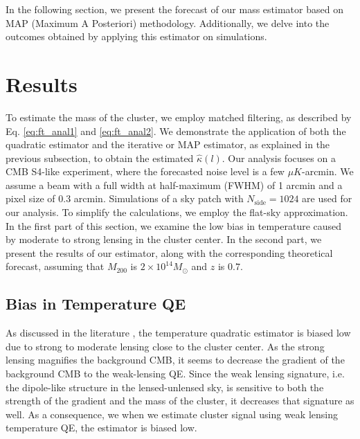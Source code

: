 \documentclass[prd, superscriptaddress, tightenlines, longbibliography, nofootinbib, eqsecnum, amsfonts, amsmath, floatfix, twocolumn, notitlepage]{revtex4-2}
\begin{document}
In the following section, we present the forecast of our mass estimator based on MAP (Maximum A Posteriori) methodology. Additionally, we delve into the outcomes obtained by applying this estimator on simulations.

\section{Results}
\label{sec:results}

To estimate the mass of the cluster, we employ matched filtering, as described by Eq. \ref{eq:ft_anal1} and \ref{eq:ft_anal2}. We demonstrate the application of both the quadratic estimator and the iterative or MAP estimator, as explained in the previous subsection, to obtain the estimated $\hat{\kappa}(l)$.
Our analysis focuses on a CMB S4-like experiment, where the forecasted noise level is a few $\mu K$-arcmin. We assume a beam with a full width at half-maximum (FWHM) of 1 arcmin and a pixel size of $0.3$ arcmin. Simulations of a sky patch with $N_{\text{side}}=1024$ are used for our analysis. To simplify the calculations, we employ the flat-sky approximation.
In the first part of this section, we examine the low bias in temperature caused by moderate to strong lensing in the cluster center. In the second part, we present the results of our estimator, along with the corresponding theoretical forecast, assuming that $M_{200}$ is $2\times10^{14} M_{\odot}$ and $z$ is $0.7$.
\subsection{Bias in Temperature QE}
As discussed in the literature \cite{Hu:2007bt, Maturi:2004zj, Amblard:2004ih}, the temperature quadratic estimator is biased low due to strong to moderate lensing close to the cluster center. As the strong lensing magnifies the background CMB, it seems to decrease the gradient of the background CMB to the weak-lensing QE. Since the weak lensing signature, i.e. the dipole-like structure in the lensed-unlensed sky, is sensitive to both the strength of the gradient and the mass of the cluster, it decreases that signature as well. As a consequence, we when we estimate cluster signal using weak lensing temperature QE, the estimator is biased low. 
\end{document}
